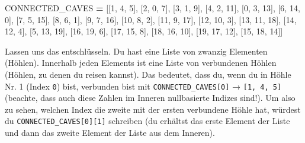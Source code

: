 \documentclass[
]{book}
\newenvironment{Shaded}{\begin{snugshade}}{\end{snugshade}}
\newcommand{\DecValTok}[1]{\textcolor[rgb]{0.00,0.00,0.81}{#1}}
\newcommand{\NormalTok}[1]{#1}
\newcommand{\OperatorTok}[1]{\textcolor[rgb]{0.81,0.36,0.00}{\textbf{#1}}}
\begin{document}
\begin{Shaded}
\begin{Highlighting}[]
\NormalTok{CONNECTED\_CAVES }\OperatorTok{=}\NormalTok{ [[}\DecValTok{1}\NormalTok{, }\DecValTok{4}\NormalTok{, }\DecValTok{5}\NormalTok{], [}\DecValTok{2}\NormalTok{, }\DecValTok{0}\NormalTok{, }\DecValTok{7}\NormalTok{], [}\DecValTok{3}\NormalTok{, }\DecValTok{1}\NormalTok{, }\DecValTok{9}\NormalTok{], [}\DecValTok{4}\NormalTok{, }\DecValTok{2}\NormalTok{, }\DecValTok{11}\NormalTok{], }
\NormalTok{                   [}\DecValTok{0}\NormalTok{, }\DecValTok{3}\NormalTok{, }\DecValTok{13}\NormalTok{], [}\DecValTok{6}\NormalTok{, }\DecValTok{14}\NormalTok{, }\DecValTok{0}\NormalTok{], [}\DecValTok{7}\NormalTok{, }\DecValTok{5}\NormalTok{, }\DecValTok{15}\NormalTok{], [}\DecValTok{8}\NormalTok{, }\DecValTok{6}\NormalTok{, }\DecValTok{1}\NormalTok{], }
\NormalTok{                   [}\DecValTok{9}\NormalTok{, }\DecValTok{7}\NormalTok{, }\DecValTok{16}\NormalTok{], [}\DecValTok{10}\NormalTok{, }\DecValTok{8}\NormalTok{, }\DecValTok{2}\NormalTok{], [}\DecValTok{11}\NormalTok{, }\DecValTok{9}\NormalTok{, }\DecValTok{17}\NormalTok{], [}\DecValTok{12}\NormalTok{, }\DecValTok{10}\NormalTok{, }\DecValTok{3}\NormalTok{], }
\NormalTok{                   [}\DecValTok{13}\NormalTok{, }\DecValTok{11}\NormalTok{, }\DecValTok{18}\NormalTok{], [}\DecValTok{14}\NormalTok{, }\DecValTok{12}\NormalTok{, }\DecValTok{4}\NormalTok{], [}\DecValTok{5}\NormalTok{, }\DecValTok{13}\NormalTok{, }\DecValTok{19}\NormalTok{], [}\DecValTok{16}\NormalTok{, }\DecValTok{19}\NormalTok{, }\DecValTok{6}\NormalTok{], }
\NormalTok{                   [}\DecValTok{17}\NormalTok{, }\DecValTok{15}\NormalTok{, }\DecValTok{8}\NormalTok{], [}\DecValTok{18}\NormalTok{, }\DecValTok{16}\NormalTok{, }\DecValTok{10}\NormalTok{], [}\DecValTok{19}\NormalTok{, }\DecValTok{17}\NormalTok{, }\DecValTok{12}\NormalTok{], [}\DecValTok{15}\NormalTok{, }\DecValTok{18}\NormalTok{, }\DecValTok{14}\NormalTok{]]}
\end{Highlighting}
\end{Shaded}

Lassen uns das entschlüsseln. Du hast eine Liste von zwanzig Elementen (Höhlen). Innerhalb jeden Elements ist eine Liste von verbundenen Höhlen (Höhlen, zu denen du reisen kannst). Das bedeutet, dass du, wenn du in Höhle Nr. 1 (Index \texttt{0}) bist, verbunden bist mit \texttt{CONNECTED\_CAVES{[}0{]}} → \texttt{{[}1,\ 4,\ 5{]}} (beachte, dass auch diese Zahlen im Inneren nullbasierte Indizes sind!). Um also zu sehen, welchen Index die zweite mit der ersten verbundene Höhle hat, würdest du \texttt{CONNECTED\_CAVES{[}0{]}{[}1{]}} schreiben (du erhältst das erste Element der Liste und dann das zweite Element der Liste aus dem Inneren).
\end{document}
